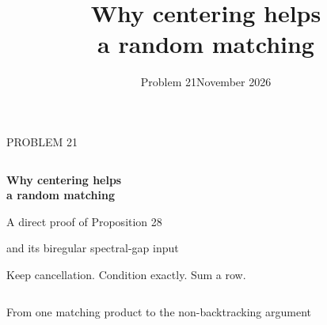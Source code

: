\documentclass[aspectratio=169,11pt]{beamer}
\title{Why centering helps\protect\\a random matching}
\author{}
\date{Problem 21\quad November 2026}
\newcommand{\slidesource}{}
\newcommand{\source}[1]{\gdef\slidesource{#1}}
\newcommand{\1}{\mathbf 1}
\newcommand{\smallgap}{\vspace{2mm}}
\newcommand{\cellgrid}{\draw[grid,step=0.45] (0,0) grid (2.25,2.25);}
\begin{document}
\setlength{\abovedisplayskip}{7pt}
\setlength{\belowdisplayskip}{7pt}
\setlength{\abovedisplayshortskip}{4pt}
\setlength{\belowdisplayshortskip}{4pt}

\source{Problem 21 submission. The report contains the full proofs, source audit and tool-use record.}
\begin{frame}[plain]
\vspace{5mm}
{\color{teal}\normalsize PROBLEM 21}\par\vspace{5mm}
\begin{columns}[T,onlytextwidth]
\begin{column}{0.69\textwidth}
{\fontsize{26}{30}\selectfont\bfseries Why centering helps\\a random matching}\par
\vspace{5mm}
{\large A direct proof of Proposition 28}\par
\smallgap
{\large and its biregular spectral-gap input}\par
\vspace{7mm}
{\color{muted}\normalsize Keep cancellation. Condition exactly. Sum a row.}
\end{column}
\begin{column}{0.27\textwidth}
\centering
{}
\end{column}
\end{columns}
\vfill
{\color{navy}\large From one matching product to the non-backtracking argument}
\end{frame}
\end{document}
